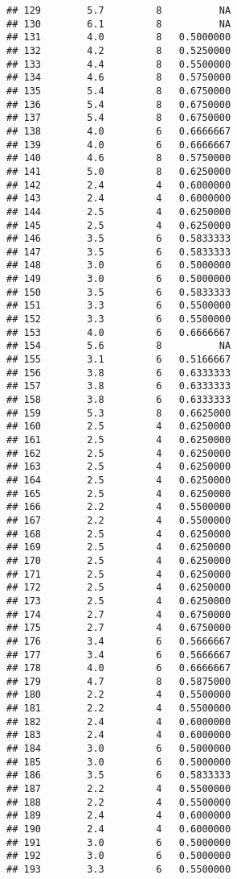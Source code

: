 \documentclass[]{article}
\begin{document}
\begin{verbatim}
## 129        5.7         8          NA
## 130        6.1         8          NA
## 131        4.0         8   0.5000000
## 132        4.2         8   0.5250000
## 133        4.4         8   0.5500000
## 134        4.6         8   0.5750000
## 135        5.4         8   0.6750000
## 136        5.4         8   0.6750000
## 137        5.4         8   0.6750000
## 138        4.0         6   0.6666667
## 139        4.0         6   0.6666667
## 140        4.6         8   0.5750000
## 141        5.0         8   0.6250000
## 142        2.4         4   0.6000000
## 143        2.4         4   0.6000000
## 144        2.5         4   0.6250000
## 145        2.5         4   0.6250000
## 146        3.5         6   0.5833333
## 147        3.5         6   0.5833333
## 148        3.0         6   0.5000000
## 149        3.0         6   0.5000000
## 150        3.5         6   0.5833333
## 151        3.3         6   0.5500000
## 152        3.3         6   0.5500000
## 153        4.0         6   0.6666667
## 154        5.6         8          NA
## 155        3.1         6   0.5166667
## 156        3.8         6   0.6333333
## 157        3.8         6   0.6333333
## 158        3.8         6   0.6333333
## 159        5.3         8   0.6625000
## 160        2.5         4   0.6250000
## 161        2.5         4   0.6250000
## 162        2.5         4   0.6250000
## 163        2.5         4   0.6250000
## 164        2.5         4   0.6250000
## 165        2.5         4   0.6250000
## 166        2.2         4   0.5500000
## 167        2.2         4   0.5500000
## 168        2.5         4   0.6250000
## 169        2.5         4   0.6250000
## 170        2.5         4   0.6250000
## 171        2.5         4   0.6250000
## 172        2.5         4   0.6250000
## 173        2.5         4   0.6250000
## 174        2.7         4   0.6750000
## 175        2.7         4   0.6750000
## 176        3.4         6   0.5666667
## 177        3.4         6   0.5666667
## 178        4.0         6   0.6666667
## 179        4.7         8   0.5875000
## 180        2.2         4   0.5500000
## 181        2.2         4   0.5500000
## 182        2.4         4   0.6000000
## 183        2.4         4   0.6000000
## 184        3.0         6   0.5000000
## 185        3.0         6   0.5000000
## 186        3.5         6   0.5833333
## 187        2.2         4   0.5500000
## 188        2.2         4   0.5500000
## 189        2.4         4   0.6000000
## 190        2.4         4   0.6000000
## 191        3.0         6   0.5000000
## 192        3.0         6   0.5000000
## 193        3.3         6   0.5500000

\end{verbatim}
\end{document}
